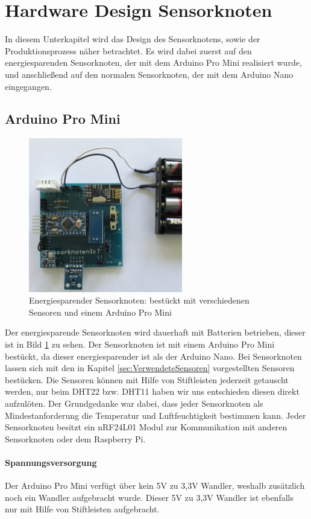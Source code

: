\section{Hardware Design Sensorknoten}
\label{sec:HardwareDesign}
In diesem Unterkapitel wird das Design des Sensorknotens, sowie der Produktionsprozess näher betrachtet. Es wird dabei zuerst auf den energiesparenden Sensorknoten, der mit dem Arduino Pro Mini realisiert wurde, und anschließend auf den normalen Sensorknoten, der mit dem Arduino Nano eingegangen.
\subsection{Arduino Pro Mini}
\begin{figure}
	\centering
	\includegraphics[width=0.6\textwidth]{bilder/mini_cutted}
	\caption[Energiesparender Sensorknoten]{Energiesparender Sensorknoten: bestückt mit verschiedenen Sensoren und einem Arduino Pro Mini}
	\label{img:ArduinoProMini}
\end{figure}
Der energiesparende Sensorknoten wird dauerhaft mit Batterien betrieben, dieser ist in Bild \ref{img:ArduinoProMini} zu sehen. Der Sensorknoten ist mit einem Arduino Pro Mini bestückt, da dieser energiesparender ist als der Arduino Nano. Bei Sensorknoten lassen sich mit den in Kapitel \ref{sec:VerwendeteSensoren} vorgestellten Sensoren bestücken. Die Sensoren können mit Hilfe von Stiftleisten jederzeit getauscht werden, nur beim DHT22 bzw. DHT11 haben wir uns entschieden diesen direkt aufzulöten. Der Grundgedanke war dabei, dass jeder Sensorknoten als Mindestanforderung die Temperatur und Luftfeuchtigkeit bestimmen kann. Jeder Sensorknoten besitzt ein nRF24L01 Modul zur Kommunikation mit anderen Sensorknoten oder dem Raspberry Pi.
\paragraph{Spannungsversorgung} Der Arduino Pro Mini verfügt über kein 5V zu 3,3V Wandler, weshalb zusätzlich noch ein Wandler aufgebracht wurde. Dieser 5V zu 3,3V Wandler ist ebenfalls nur mit Hilfe von Stiftleisten aufgebracht. 

